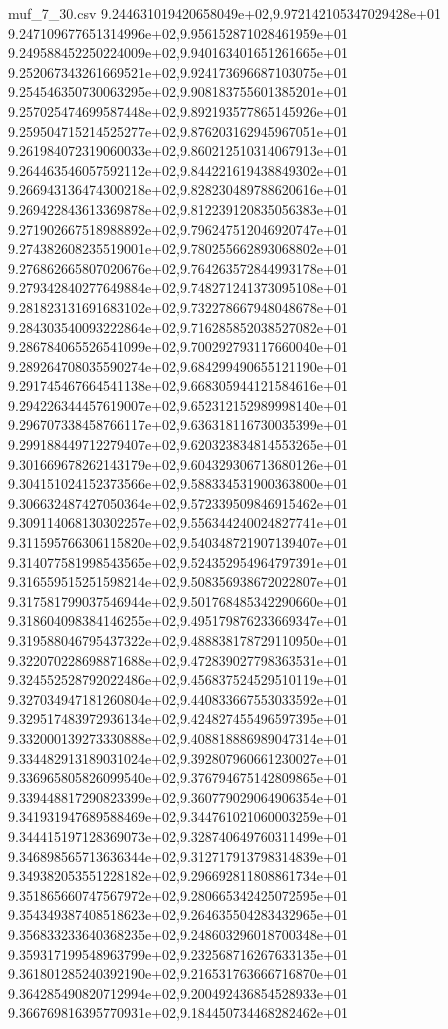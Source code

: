 \begin{filecontents*}{muf_7_30.csv}
9.244631019420658049e+02,9.972142105347029428e+01
9.247109677651314996e+02,9.956152871028461959e+01
9.249588452250224009e+02,9.940163401651261665e+01
9.252067343261669521e+02,9.924173696687103075e+01
9.254546350730063295e+02,9.908183755601385201e+01
9.257025474699587448e+02,9.892193577865145926e+01
9.259504715214525277e+02,9.876203162945967051e+01
9.261984072319060033e+02,9.860212510314067913e+01
9.264463546057592112e+02,9.844221619438849302e+01
9.266943136474300218e+02,9.828230489788620616e+01
9.269422843613369878e+02,9.812239120835056383e+01
9.271902667518988892e+02,9.796247512046920747e+01
9.274382608235519001e+02,9.780255662893068802e+01
9.276862665807020676e+02,9.764263572844993178e+01
9.279342840277649884e+02,9.748271241373095108e+01
9.281823131691683102e+02,9.732278667948048678e+01
9.284303540093222864e+02,9.716285852038527082e+01
9.286784065526541099e+02,9.700292793117660040e+01
9.289264708035590274e+02,9.684299490655121190e+01
9.291745467664541138e+02,9.668305944121584616e+01
9.294226344457619007e+02,9.652312152989998140e+01
9.296707338458766117e+02,9.636318116730035399e+01
9.299188449712279407e+02,9.620323834814553265e+01
9.301669678262143179e+02,9.604329306713680126e+01
9.304151024152373566e+02,9.588334531900363800e+01
9.306632487427050364e+02,9.572339509846915462e+01
9.309114068130302257e+02,9.556344240024827741e+01
9.311595766306115820e+02,9.540348721907139407e+01
9.314077581998543565e+02,9.524352954964797391e+01
9.316559515251598214e+02,9.508356938672022807e+01
9.317581799037546944e+02,9.501768485342290660e+01
9.318604098384146255e+02,9.495179876233669347e+01
9.319588046795437322e+02,9.488838178729110950e+01
9.322070228698871688e+02,9.472839027798363531e+01
9.324552528792022486e+02,9.456837524529510119e+01
9.327034947181260804e+02,9.440833667553033592e+01
9.329517483972936134e+02,9.424827455496597395e+01
9.332000139273330888e+02,9.408818886989047314e+01
9.334482913189031024e+02,9.392807960661230027e+01
9.336965805826099540e+02,9.376794675142809865e+01
9.339448817290823399e+02,9.360779029064906354e+01
9.341931947689588469e+02,9.344761021060003259e+01
9.344415197128369073e+02,9.328740649760311499e+01
9.346898565713636344e+02,9.312717913798314839e+01
9.349382053551228182e+02,9.296692811808861734e+01
9.351865660747567972e+02,9.280665342425072595e+01
9.354349387408518623e+02,9.264635504283432965e+01
9.356833233640368235e+02,9.248603296018700348e+01
9.359317199548963799e+02,9.232568716267633135e+01
9.361801285240392190e+02,9.216531763666716870e+01
9.364285490820712994e+02,9.200492436854528933e+01
9.366769816395770931e+02,9.184450734468282462e+01

\end{filecontents*}
